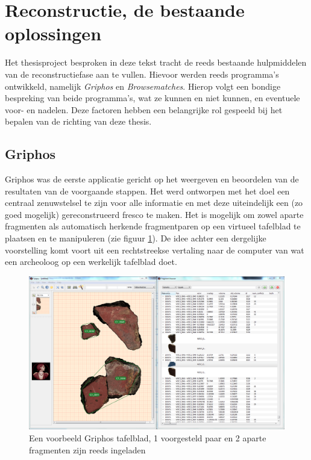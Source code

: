 \section{Reconstructie, de bestaande oplossingen}
Het thesisproject besproken in deze tekst tracht de reeds bestaande hulpmiddelen van de reconstructiefase aan te vullen. Hievoor werden reeds programma's ontwikkeld, namelijk \emph{Griphos} en \emph{Browsematches}. Hierop volgt een bondige bespreking van beide programma's, wat ze kunnen en niet kunnen, en eventuele voor- en nadelen. Deze factoren hebben een belangrijke rol gespeeld bij het bepalen van de richting van deze thesis.

\subsection{Griphos}

Griphos was de eerste applicatie gericht op het weergeven en beoordelen van de resultaten van de voorgaande stappen. Het werd ontworpen met het doel een centraal zenuwstelsel te zijn voor alle informatie en met deze uiteindelijk een (zo goed mogelijk) gereconstrueerd fresco te maken. Het is mogelijk om zowel aparte fragmenten als automatisch herkende fragmentparen op een virtueel tafelblad te plaatsen en te manipuleren (zie figuur \ref{fig:griphostafelblad}). De idee achter een dergelijke voorstelling komt voort uit een rechtstreekse vertaling naar de computer van wat een archeoloog op een werkelijk tafelblad doet.\\

\begin{figure}[ht]
	\begin{center}
		\includegraphics[width=.8\columnwidth]{images/griphos-01-cut.png}
		\caption{Een voorbeeld Griphos tafelblad, 1 voorgesteld paar en 2 aparte fragmenten zijn reeds ingeladen}
		\label{fig:griphostafelblad}
	\end{center}
\end{figure}

